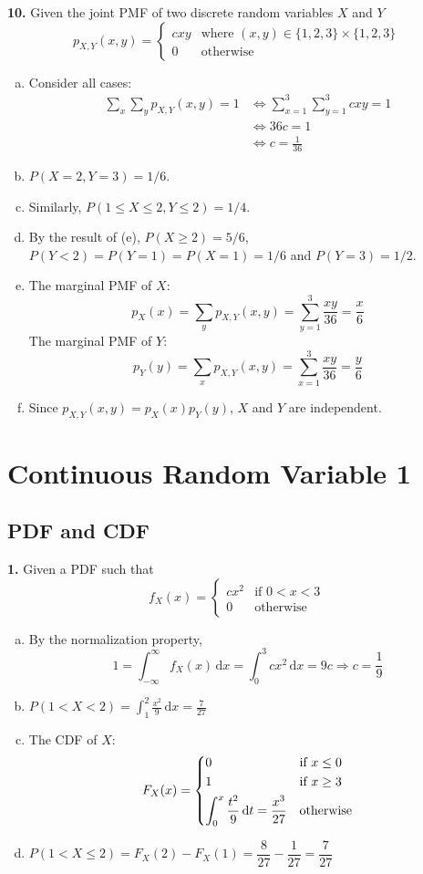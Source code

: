 \documentclass[a4paper,12pt]{article}
\newcommand{\ud}{\,\mathrm{d}}
\newcommand{\exercise}[1]{\noindent\textbf{#1.}}
\begin{document}
\exercise{10} Given the joint PMF of two discrete random variables $X$ and $Y$
\[p_{X,Y}(x, y) = \begin{cases}
  cxy &\text{where }(x, y)\in\{1, 2, 3\}\times\{1, 2, 3\}\\
  0 &\text{otherwise}
\end{cases}\]
\begin{enumerate}[(a)]
  \item Consider all cases:
    \begin{align*}
      \sum_x\sum_y p_{X,Y}(x, y) = 1
      &\iff \sum_{x=1}^3\sum_{y=1}^3 cxy = 1\\
      &\iff 36c = 1\\
      &\iff c = \frac{1}{36}
    \end{align*}
  \item $P(X = 2, Y = 3) = 1/6$.
  \item Similarly, $P(1\le X\le 2, Y\le 2) = 1/4$.
  \item By the result of (e), $P(X\ge 2) = 5/6$,
    $P(Y < 2) = P(Y = 1) = P(X = 1) = 1/6$ and $P(Y = 3) = 1/2$.
  \item The marginal PMF of $X$:
    \[p_X(x) = \sum_y p_{X,Y}(x, y)
    = \sum_{y=1}^3\frac{xy}{36} = \frac{x}{6}\]
    The marginal PMF of $Y$:
    \[p_Y(y) = \sum_x p_{X,Y}(x, y)
    = \sum_{x=1}^3\frac{xy}{36} = \frac{y}{6}\]
  \item Since $p_{X,Y}(x, y) = p_X(x)p_Y(y)$, $X$ and $Y$ are independent.
\end{enumerate}
\pagebreak

\section{Continuous Random Variable 1}
\subsection{PDF and CDF}
\exercise 1  Given a PDF such that
\[f_X(x) = \begin{cases}
  cx^2 &\text{if }0 < x < 3\\
  0 &\text{otherwise}
\end{cases}\]
\begin{enumerate}[(a)]
  \item By the normalization property,
    \[1 = \int_{-\infty}^{\infty}f_X(x)\ud x = \int_0^3 cx^2\ud x = 9c
    \Longrightarrow c = \frac{1}{9}\]
  \item $\displaystyle P(1 < X < 2) = \int_1^2\frac{x^2}{9}\ud x = \frac{7}{27}$
  \item The CDF of $X$:
    \[F_X(x) = \begin{dcases}
      0 &\text{if }x \le 0\\
      1 &\text{if }x \ge 3\\
      \int_0^x\frac{t^2}{9}\ud t = \frac{x^3}{27} &\text{otherwise}
    \end{dcases}\]
  \item $P(1 < X \le 2) = F_X(2) - F_X(1)
    = \dfrac{8}{27} - \dfrac{1}{27} = \dfrac{7}{27}$
\end{enumerate}
\end{document}
